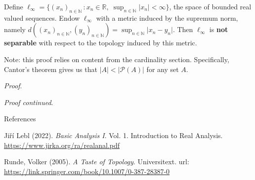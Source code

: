 \documentclass [aspectratio=169]{beamer}
\newcommand{\R}{{\mathbb{R}}}
\newcommand{\N}{{\mathbb{N}}}
\newcommand{\cP}{\mathcal{P}}
\begin{document}
\begin{frame}
\begin{example}
Define $\ell_\infty=\{ (x_n)_{n\in \N} \, : x_n \in \R , \; \sup_{n\in \N} \vert x_n \vert <\infty \}$, the space of bounded real valued sequences. Endow $\ell_\infty$ with a metric induced by the supremum norm, namely $d((x_n)_{n\in \N}, (y_n)_{n\in \N}) = \sup_{n\in \N} \vert x_n-y_n\vert$. 
Then $\ell_\infty$ is \textbf{not separable} with respect to the topology induced by this metric. 
\end{example}

\vspace{0.5em}
Note: this proof relies on content from the cardinality section. Specifically, Cantor's theorem gives us that $|A| < |\cP(A)|$ for any set $A$.

\vspace{0.5em}
\textit{Proof}.
\vspace{2.5cm}

\end{frame}


\begin{frame}
\textit{Proof continued}.
\vspace{7cm}

\end{frame}







\begin{frame}{References}

Ji\v{r}í Lebl (2022). \textit{Basic Analysis I}. Vol. 1. Introduction to Real Analysis.  \href{ https://www.jirka.org/ra/realanal.pdf}{https://www.jirka.org/ra/realanal.pdf} 

\vspace{1em}


Runde, Volker (2005). \textit{A Taste of Topology}. Universitext.  url:  \href{https://link.springer.com/book/10.1007/0-387-28387-0}{https://link.springer.com/book/10.1007/0-387-28387-0} 


\end{frame}
\end{document}
